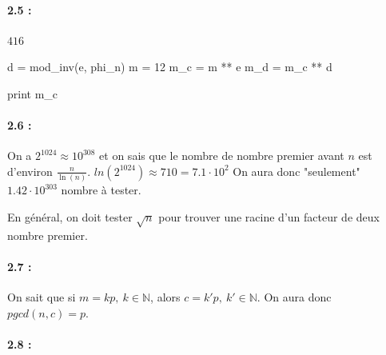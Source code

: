 \documentclass[11pt,a4paper]{report}
\begin{document}
\paragraph*{2.5 : } $416$
\begin{pythoncode}
d = mod_inv(e, phi_n)
m = 12
m_c = m ** e %
m_d = m_c ** d %

print m_c
\end{pythoncode}

\paragraph*{2.6 : } On a $2^{1024} \approx 10^{308}$ et on sais que le nombre de nombre premier avant $n$ est d'environ $\frac{n}{\ln(n)}$. $ln(2^{1024}) \approx 710 = 7.1 \cdot 10^{2}$ On aura donc "seulement" $1.42 \cdot 10^{303}$ nombre à tester.

En général, on doit tester $\sqrt{n}$ pour trouver une racine d'un facteur de deux nombre premier.

\paragraph*{2.7 : } On sait que si $m=kp,\ k\in{\mathbb{N}}$, alors $c=k'p,\ k'\in\mathbb{N}$. On aura donc $pgcd(n,c) = p$.

\paragraph*{2.8 : } 
\end{document}

